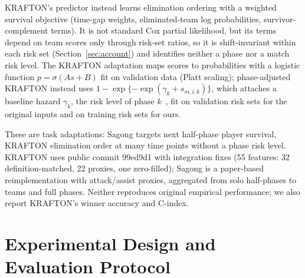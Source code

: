 \documentclass[sigconf,anonymous]{acmart}
\begin{document}
KRAFTON's predictor instead learns elimination ordering with a weighted survival objective (time-gap weights, eliminated-team log probabilities, survivor-complement terms). It is not standard Cox partial likelihood, but its terms depend on team scores only through risk-set ratios, so it is shift-invariant within each risk set (Section~\ref{sec:account}) and identifies neither a phase nor a match risk level. The KRAFTON adaptation maps scores to probabilities with a logistic function $p=\sigma(A s+B)$ fit on validation data (Platt scaling); phase-adjusted KRAFTON instead uses $1-\exp\{-\exp(\gamma_k+s_{m,i,k})\}$, which attaches a baseline hazard $\gamma_k$, the risk level of phase $k$~\cite{PrenticeGloeckler78}, fit on validation risk sets for the original inputs and on training risk sets for ours.

These are task adaptations: Sagong targets next half-phase player survival, KRAFTON elimination order at many time points without a phase risk level. KRAFTON uses public commit 99ed9d1 with integration fixes (55 features: 32 definition-matched, 22 proxies, one zero-filled); Sagong is a paper-based reimplementation with attack/assist proxies, aggregated from solo half-phases to teams and full phases. Neither reproduces original empirical performance; we also report KRAFTON's winner accuracy and C-index.

\section{Experimental Design and Evaluation Protocol}
\label{sec:method:evaluation}
\end{document}
